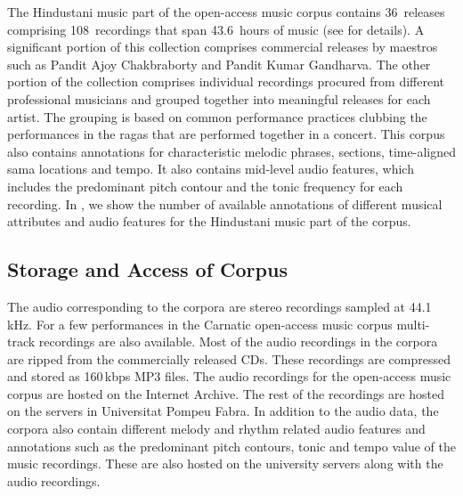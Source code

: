 The Hindustani music part of the open-access music corpus contains 36~releases comprising 108~recordings that span 43.6~hours of music (see  for details). A significant portion of this collection comprises commercial releases by maestros such as Pandit Ajoy Chakbraborty and Pandit Kumar Gandharva. The other portion of the collection comprises individual recordings procured from different professional musicians and grouped together into meaningful releases for each artist. The grouping is based on common performance practices clubbing the performances in the \glspl{raga} that are performed together in a concert. This corpus also contains annotations for characteristic melodic phrases, sections, time-aligned sama locations and tempo. It also contains mid-level audio features, which includes the predominant pitch contour and the tonic frequency for each recording. In , we show the number of available annotations of different musical attributes and audio features for the Hindustani music part of the corpus. 

\subsection{Storage and Access of Corpus}
\label{sec:corpus_storage_and_access}


The audio corresponding to the corpora are stereo recordings sampled at 44.1\,kHz. For a few performances in the Carnatic open-access music corpus multi-track recordings are also available. Most of the audio recordings in the corpora are ripped from the commercially released CDs. These recordings are compressed and stored as 160\,kbps MP3 files. The audio recordings for the open-access music corpus are hosted on the Internet Archive. The rest of the recordings are hosted on the servers in Universitat Pompeu Fabra. In addition to the audio data, the corpora also contain different melody and rhythm related audio features and annotations such as the predominant pitch contours, tonic and tempo value of the music recordings. These are also hosted on the university servers along with the audio recordings.

